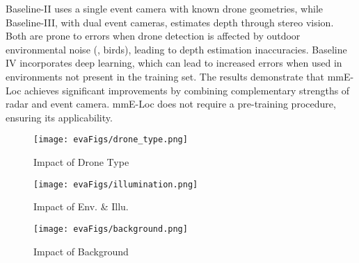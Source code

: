 {Baseline-II uses a single event camera with known drone geometries, while Baseline-III, with dual event cameras, estimates depth through stereo vision.
Both are prone to errors when drone detection is affected by outdoor environmental noise (\eg, birds), leading to depth estimation inaccuracies.
Baseline IV incorporates deep learning, which can lead to increased errors when used in environments not present in the training set.
The results demonstrate that mmE-Loc achieves significant improvements by combining complementary strengths of radar and event camera.
mmE-Loc does not require a pre-training procedure, ensuring its applicability.
}

\begin{figure*}
\setlength{\abovecaptionskip}{-0.15cm} %
\setlength{\belowcaptionskip}{-0.2cm}
\setlength{\subfigcapskip}{-0.25cm}
  \begin{minipage}[t]{0.692\columnwidth}
    \centering
    \texttt{[image: evaFigs/drone\_type.png]}
    \caption{Impact of Drone Type}
    \label{fig:drone_type}
  \end{minipage}
  \begin{minipage}[t]{0.692\columnwidth}
    \centering
    \texttt{[image: evaFigs/illumination.png]}
    \caption{Impact of Env. \& Illu.}
    \label{fig:illumination}
  \end{minipage}
  \begin{minipage}[t]{0.692\columnwidth}
    \centering
    \texttt{[image: evaFigs/background.png]}
    \caption{Impact of Background}
    \label{fig:background}
  \end{minipage}
  \hfill
  \vspace{-0.61cm}
\end{figure*}

